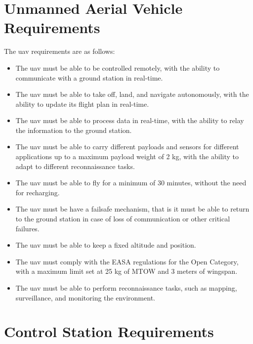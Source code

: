 \section{Unmanned Aerial Vehicle Requirements}

The \gls{uav} requirements are as follows:

\begin{itemize}
  \item The \gls{uav} must be able to be controlled remotely, with the ability to communicate with a ground station in real-time.

  \item The \gls{uav} must be able to take off, land, and navigate autonomously, with the ability to update its flight plan in real-time.

  \item The \gls{uav} must be able to process data in real-time, with the ability to relay the information to the ground station.

  \item The \gls{uav} must be able to carry different payloads and sensors for different applications up to a maximum payload weight of 2 kg, with the ability to adapt to different reconnaissance tasks.

  \item The \gls{uav} must be able to fly for a minimum of 30 minutes, without the need for recharging.

  \item The \gls{uav} must be have a failsafe mechanism, that is it must be able to return to the ground station in case of loss of communication or other critical failures.

  \item The \gls{uav} must be able to keep a fixed altitude and position.

  \item The \gls{uav} must comply with the EASA regulations for the Open Category, with a maximum limit set at 25 kg of MTOW and 3 meters of wingspan.

  \item The \gls{uav} must be able to perform reconnaissance tasks, such as mapping, surveillance, and monitoring the environment.
\end{itemize}

\section{Control Station Requirements}

